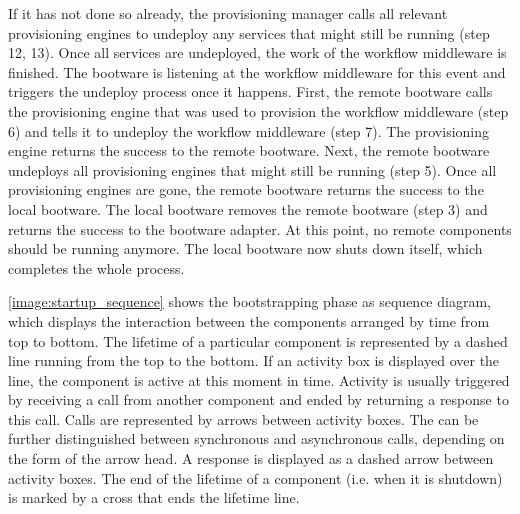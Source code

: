 If it has not done so already, the provisioning manager calls all relevant provisioning engines to undeploy any services that might still be running (step 12, 13).
Once all services are undeployed, the work of the workflow middleware is finished.
The bootware is listening at the workflow middleware for this event and triggers the undeploy process once it happens.
First, the remote bootware calls the provisioning engine that was used to provision the workflow middleware (step 6) and tells it to undeploy the workflow middleware (step 7).
The provisioning engine returns the success to the remote bootware.
Next, the remote bootware undeploys all provisioning engines that might still be running (step 5).
Once all provisioning engines are gone, the remote bootware returns the success to the local bootware.
The local bootware removes the remote bootware (step 3) and returns the success to the bootware adapter.
At this point, no remote components should be running anymore.
The local bootware now shuts down itself, which completes the whole process.

\autoref{image:startup_sequence} shows the bootstrapping phase as sequence diagram, which displays the interaction between the components arranged by time from top to bottom.
The lifetime of a particular component is represented by a dashed line running from the top to the bottom.
If an activity box is displayed over the line, the component is active at this moment in time.
Activity is usually triggered by receiving a call from another component and ended by returning a response to this call.
Calls are represented by arrows between activity boxes.
The can be further distinguished between synchronous and asynchronous calls, depending on the form of the arrow head.
A response is displayed as a dashed arrow between activity boxes.
The end of the lifetime of a component (i.e. when it is shutdown) is marked by a cross that ends the lifetime line.

